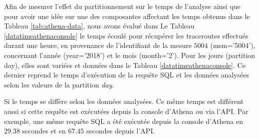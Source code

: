 Afin de mesurer l'effet du partitionnement sur le temps de l'analyse ainsi que pour avoir une idée sur une des composantes affectant les temps obtenus dans le Tableau \ref{tab:athena-data}, nous avons évalué dans  Le Tableau \ref{datatimeathenaconsole}  le temps écoulé pour récupérer les traceroutes effectués durant une heure,  en provenance de l'identifiant de la mesure $5004$ (msm='5004'), concernant l'année (year='2018') et le mois (month='2'). Pour les jours (partition day), elles sont variées et données dans le Tableau   \ref{datatimeathenaconsole}.
Ce dernier reprend le temps d'exécution de la requête SQL et les données analysées selon les valeurs de la partition \textit{day}.
\begin{table}[h]
	\captionsetup{justification=centering}
	\centering
\caption{Les temps d'exécution d'une requête SQL sur Amazon Athena selon les données analysées}
\label{datatimeathenaconsole}
\end{table}




Si le temps se diffère selon les données analysées. Ce même temps est différent aussi si cette requête est exécutées depuis la console d'Athena ou via l'API. Par exemple, une même requête SQL a été exécutée depuis la console d'Athena  en $ 29.38 $ secondes et en $ 67.45 $ secondes depuis l'API.






